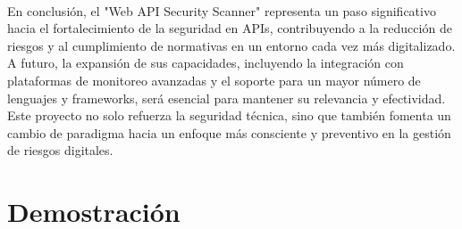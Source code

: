 \documentclass{article}
\begin{document}
    \\[2\baselineskip]
    En conclusión, el "Web API Security Scanner" representa un paso significativo hacia el fortalecimiento de la seguridad en APIs, contribuyendo a la reducción de riesgos y al cumplimiento de normativas en un entorno cada vez más digitalizado. A futuro, la expansión de sus capacidades, incluyendo la integración con plataformas de monitoreo avanzadas y el soporte para un mayor número de lenguajes y frameworks, será esencial para mantener su relevancia y efectividad. Este proyecto no solo refuerza la seguridad técnica, sino que también fomenta un cambio de paradigma hacia un enfoque más consciente y preventivo en la gestión de riesgos digitales.

    \newpage
    \section{Demostración}
\end{document}
